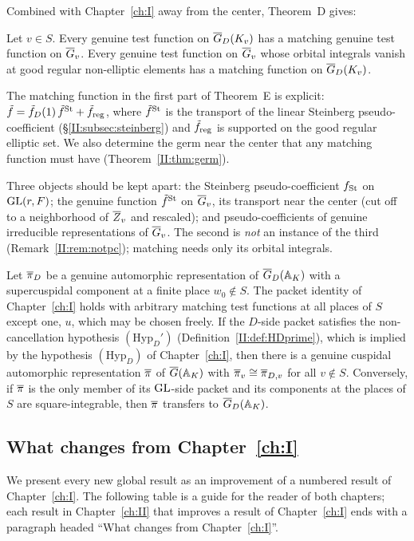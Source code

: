 Combined with Chapter~\ref{ch:I} away from the center, Theorem~D gives:

\begin{theoremE}
Let $v\in S$. Every genuine test function on $\overline{G}_D(K_v)$ has a matching genuine test function on $\overline{G}_v$. Every genuine test function on $\overline{G}_v$ whose orbital integrals vanish at good regular non-elliptic elements has a matching function on $\overline{G}_D(K_v)$.
\end{theoremE}

The matching function in the first part of Theorem~E is explicit: $\tilde f=\tilde f_D(1)\,\tilde f^{\mathrm{St}}+\tilde f_{\mathrm{reg}}$, where $\tilde f^{\mathrm{St}}$ is the transport of the linear Steinberg pseudo-coefficient (\S\ref{II:subsec:steinberg}) and $\tilde f_{\mathrm{reg}}$ is supported on the good regular elliptic set. We also determine the germ near the center that any matching function must have (Theorem~\ref{II:thm:germ}).

Three objects should be kept apart: the Steinberg pseudo-coefficient $f_{\mathrm{St}}$ on $\mathrm{GL}(r,F)$; the genuine function $\tilde f^{\mathrm{St}}$ on $\overline{G}_v$, its transport near the center (cut off to a neighborhood of $\overline{Z}_v$ and rescaled); and pseudo-coefficients of genuine irreducible representations of $\overline{G}_v$. The second is \emph{not} an instance of the third (Remark~\ref{II:rem:notpc}); matching needs only its orbital integrals.

\begin{theoremCp}
Let $\overline{\pi}_D$ be a genuine automorphic representation of $\overline{G}_D(\mathbb{A}_K)$ with a supercuspidal component at a finite place $w_0\notin S$. The packet identity of Chapter~\ref{ch:I} holds with arbitrary matching test functions at all places of $S$ except one, $u$, which may be chosen freely. If the $D$-side packet satisfies the non-cancellation hypothesis $(\mathrm{Hyp}_D')$ (Definition~\ref{II:def:HDprime}), which is implied by the hypothesis $(\mathrm{Hyp}_D)$ of Chapter~\ref{ch:I}, then there is a genuine cuspidal automorphic representation $\overline{\pi}$ of $\overline{G}(\mathbb{A}_K)$ with $\overline{\pi}_v\cong\overline{\pi}_{D,v}$ for all $v\notin S$. Conversely, if $\overline{\pi}$ is the only member of its $\mathrm{GL}$-side packet and its components at the places of $S$ are square-integrable, then $\overline{\pi}$ transfers to $\overline{G}_D(\mathbb{A}_K)$.
\end{theoremCp}

\subsection{What changes from Chapter~\ref{ch:I}}\label{II:subsec:changes}
We present every new global result as an improvement of a numbered result of Chapter~\ref{ch:I}. The following table is a guide for the reader of both chapters; each result in Chapter~\ref{ch:II} that improves a result of Chapter~\ref{ch:I} ends with a paragraph headed ``What changes from Chapter~\ref{ch:I}''.

